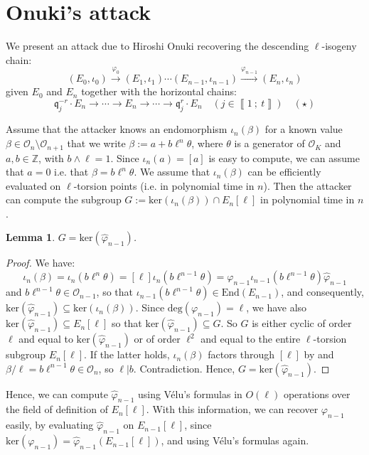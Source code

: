 \documentclass[a4paper,10pt]{article}
\theoremstyle{definition}
\theoremstyle{plain}
\newtheorem{lemma}[definition]{Lemma}
\theoremstyle{definition}
\newcommand{\Z}{\mathbb{Z}}
\newcommand{\mO}{\mathcal{O}}
\renewcommand{\ker}{\mbox{ker}}
\renewcommand{\deg}{\mbox{deg}}
\renewcommand{\i}[2]{\left\llbracket #1~;~#2\right\rrbracket}
\renewcommand{\(}{\left(}
\renewcommand{\)}{\right)}
\newcommand{\mf}[1]{\mathfrak{#1}}
\newcommand{\End}{\mbox{End}}
\begin{document}
\section{Onuki's attack}

We present an attack due to Hiroshi Onuki \cite[§ 6.3]{Onuki} recovering the descending $\ell$-isogeny chain:
\[(E_0, \iota_0)\overset{\varphi_0}{\longrightarrow}(E_1,\iota_1)\cdots(E_{n-1},\iota_{n-1})\overset{\varphi_{n-1}}{\longrightarrow}(E_n,\iota_n)\] 
given $E_0$ and $E_n$ together with the horizontal chains:
\[\mf{q}_j^{-r}\cdot E_n\longrightarrow \cdots \longrightarrow E_n\longrightarrow \cdots\longrightarrow \mf{q}_j^{r}\cdot E_n \quad (j\in\i{1}{t})\quad (\star)\]

Assume that the attacker knows an endomorphism $\iota_n(\beta)$ for a known value $\beta\in\mO_n\setminus \mO_{n+1}$ that we write $\beta:=a+b\ell^n\theta$, where $\theta$ is a generator of $\mO_K$ and $a,b\in\Z$, with $b\wedge \ell=1$. Since $\iota_n(a)=[a]$ is easy to compute, we can assume that $a=0$ i.e. that $\beta=b\ell^n\theta$. We assume that $\iota_n(\beta)$ can be efficiently evaluated on $\ell$-torsion points (i.e. in polynomial time in $n$). Then the attacker can compute the subgroup $G:=\ker(\iota_n(\beta))\cap  E_n[\ell]$ in polynomial time in $n$. 

\begin{lemma}
$G=\ker(\widehat{\varphi}_{n-1})$.
\end{lemma}

\begin{proof}
We have:
\[\iota_n(\beta)=\iota_n(b\ell^n\theta)=[\ell]\iota_n(b\ell^{n-1}\theta)=\varphi_{n-1}\iota_{n-1}(b\ell^{n-1}\theta)\widehat{\varphi}_{n-1}\]
and $b\ell^{n-1}\theta\in\mO_{n-1}$, so that $\iota_{n-1}(b\ell^{n-1}\theta)\in\End(E_{n-1})$, and consequently, $\ker(\widehat{\varphi}_{n-1})\subseteq\ker(\iota_n(\beta))$. Since $\deg(\varphi_{n-1})=\ell$, we have also $\ker(\widehat{\varphi}_{n-1})\subseteq E_{n}[\ell]$ so that $\ker(\widehat{\varphi}_{n-1})\subseteq G$.  So $G$ is either cyclic of order $\ell$ and equal to $\ker(\widehat{\varphi}_{n-1})$ or of order $\ell^2$ and equal to the entire $\ell$-torsion subgroup $E_n[\ell]$. If the latter holds, $\iota_n(\beta)$ factors through $[\ell]$ by \cite[corollary III.4.11]{Silverman1} and $\beta/\ell=b\ell^{n-1}\theta\in\mO_n$, so $\ell|b$. Contradiction. Hence, $G=\ker(\widehat{\varphi}_{n-1})$.
\end{proof}

Hence, we can compute $\widehat{\varphi}_{n-1}$ using V\'{e}lu's formulas \cite{Velu} in $O(\ell)$ operations over the field of definition of $E_n[\ell]$. With this information, we can recover $\varphi_{n-1}$ easily, by evaluating $\widehat{\varphi}_{n-1}$ on $E_{n-1}[\ell]$, since $\ker(\varphi_{n-1})=\widehat{\varphi}_{n-1}(E_{n-1}[\ell])$, and using V\'{e}lu's formulas again.
\end{document}
